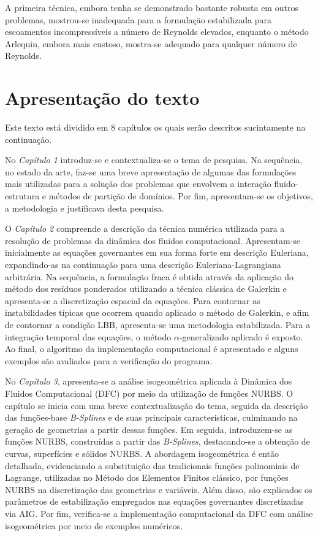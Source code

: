 A primeira técnica, embora tenha se demonstrado bastante robusta em outros problemas, mostrou-se inadequada para a formulação estabilizada para escoamentos incompressíveis a número de Reynolds elevados, enquanto o método Arlequin, embora mais custoso, mostra-se adequado para qualquer número de Reynolds.

\section{Apresentação do texto}

Este texto está dividido em 8 capítulos os quais serão descritos sucintamente na continuação.

No \textit{Capítulo 1} introduz-se e contextualiza-se o tema de pesquisa. Na sequência, no estado da arte, faz-se uma breve apresentação de algumas das formulações mais utilizadas para a solução dos problemas que envolvem a interação fluido-estrutura e métodos de partição de domínios. Por fim, apresentam-se os objetivos, a metodologia e justificava desta pesquisa.

O \textit{Capítulo 2} compreende a descrição da técnica numérica utilizada para a resolução de problemas da dinâmica dos fluidos computacional. 
Apresentam-se inicialmente as equações governantes em sua forma forte em descrição Euleriana, expandindo-as na continuação para uma descrição Euleriana-Lagrangiana arbitrária. Na sequência, a formulação fraca é obtida através da aplicação do método dos resíduos ponderados utilizando a técnica clássica de Galerkin e apresenta-se a discretização espacial da equações. Para contornar as instabilidades típicas que ocorrem quando aplicado o método de Galerkin, e afim de contornar a condição LBB, apresenta-se uma metodologia estabilizada. Para a integração temporal das equações, o método $\alpha$-generalizado aplicado é exposto. Ao final, o algoritmo da implementação computacional é apresentado e alguns exemplos são avaliados para a verificação do programa.

No \textit{Capítulo 3}, apresenta-se a análise isogeométrica aplicada à Dinâmica dos Fluidos Computacional (DFC) por meio da utilização de funções NURBS. O capítulo se inicia com uma breve contextualização do tema, seguida da descrição das funções-base \textit{B-Splines} e de suas principais características, culminando na geração de geometrias a partir dessas funções. Em seguida, introduzem-se as funções NURBS, construídas a partir das \textit{B-Splines}, destacando-se a obtenção de curvas, superfícies e sólidos NURBS. A abordagem isogeométrica é então detalhada, evidenciando a substituição das tradicionais funções polinomiais de Lagrange, utilizadas no Método dos Elementos Finitos clássico, por funções NURBS na discretização das geometrias e variáveis. Além disso, são explicados os parâmetros de estabilização empregados nas equações governantes discretizadas via AIG. Por fim, verifica-se a implementação computacional da DFC com análise isogeométrica por meio de exemplos numéricos.

